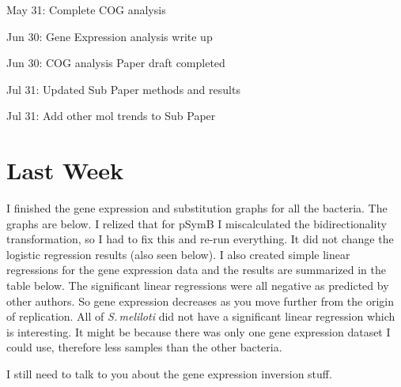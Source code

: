 \documentclass[12pt]{article}
\newcommand{\smel}{\textit{S.\,meliloti}\xspace}
\newcommand{\pb}{pSymB\xspace}
\begin{document}
	May 31:	Complete COG analysis
	
	Jun 30:	Gene Expression analysis write up
	
	Jun 30:	COG analysis Paper draft completed
	
	Jul 31:	Updated Sub Paper methods and results
	
	Jul 31: Add other mol trends to Sub Paper
	
\section*{Last Week}
I finished the gene expression and substitution graphs for all the bacteria. The graphs are below.
I relized that for \pb I miscalculated the bidirectionality transformation, so I had to fix this and re-run everything.
It did not change the logistic regression results (also seen below).
I also created simple linear regressions for the gene expression data and the results are summarized in the table below.
The significant linear regressions were all negative as predicted by other authors.
So gene expression decreases as you move further from the origin of replication.
All of \smel did not have a significant linear regression which is interesting. It might be because there was only one gene expression dataset I could use, therefore less samples than the other bacteria.

I still need to talk to you about the gene expression inversion stuff.
\end{document}
